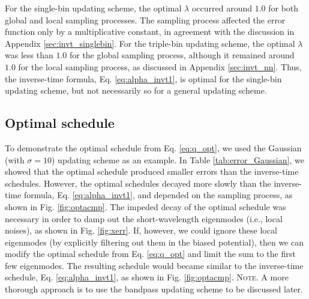 \documentclass[reprint, floatfix]{revtex4-1}
\newcommand{\note}[1]{{\color{DarkGreen}\footnotesize \textsc{Note.} #1}}
\begin{document}
For the single-bin updating scheme,
the optimal $\lambda$ occurred around $1.0$
for both global and local sampling processes.
%
The sampling process affected the error function
only by a multiplicative constant,
in agreement with the discussion in
Appendix \ref{sec:invt_singlebin}.
%
For the triple-bin updating scheme,
the optimal $\lambda$ was less than $1.0$
for the global sampling process,
although it remained around $1.0$
for the local sampling process,
as discussed in Appendix \ref{sec:invt_nn}.
%
Thus, the inverse-time formula,
Eq. \eqref{eq:alpha_invt1},
is optimal for the single-bin updating scheme,
but not necessarily so for a general updating scheme.





\subsection{\label{sec:results_optschedule}
Optimal schedule}



To demonstrate the optimal schedule from Eq. \eqref{eq:q_opt},
we used the Gaussian (with $\sigma = 10$) updating scheme
as an example.
%
In Table \ref{tab:error_Gaussian},
we showed that the optimal schedule
produced smaller errors than
the inverse-time schedules.
%
However, the optimal schedules
decayed more slowly than
the inverse-time formula, Eq. \eqref{eq:alpha_invt1},
and depended on the sampling process,
as shown in Fig. \ref{fig:optacmp}.
%
The impeded decay of the optimal schedule
was necessary in order to
damp out the short-wavelength eigenmodes
(i.e., local noises),
as shown in Fig. \ref{fig:xerr}.
%
If, however, we could ignore these local eigenmodes
(by explicitly filtering out
them in the biased potential),
then we can modify the optimal schedule
from Eq. \eqref{eq:q_opt}
and limit the sum
to the first few eigenmodes.
%
The resulting schedule
would became similar to the inverse-time schedule,
Eq. \eqref{eq:alpha_invt1},
as shown in Fig. \ref{fig:optacmp}.
%
\note{A more thorough approach is
to use the bandpass updating scheme
to be discussed later.
}
\end{document}
